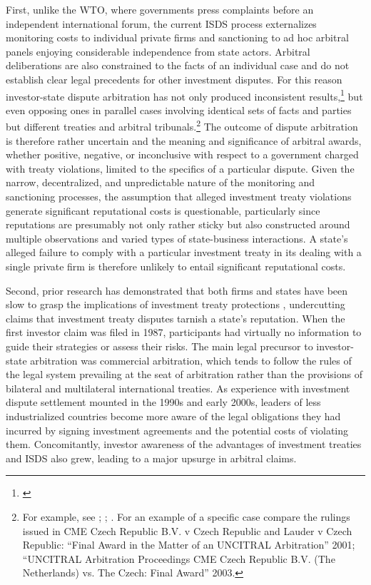 \documentclass[12pt,onesided]{amsart}
\begin{document}
First, unlike the WTO, where governments press complaints before an independent international forum, the current ISDS process externalizes monitoring costs to individual private firms and sanctioning to ad hoc arbitral panels enjoying considerable independence from state actors. Arbitral deliberations are also constrained to the facts of an individual case and do not establish clear legal precedents for other investment disputes. For this reason investor-state dispute arbitration has not only produced inconsistent results,\footnote{\citet{franck:2005}} but even opposing ones in parallel cases involving identical sets of facts and parties but different treaties and arbitral tribunals.\footnote{For example, see \citet{franck:2005}; \citet{kim2011annulment}; \citet{egli2006don}. For an example of a specific case compare the rulings issued in CME Czech Republic B.V. v Czech Republic and Lauder v Czech Republic: ``Final Award in the Matter of an UNCITRAL Arbitration'' 2001; ``UNCITRAL Arbitration Proceedings CME Czech Republic B.V. (The Netherlands) vs. The Czech: Final Award'' 2003.} The outcome of dispute arbitration is therefore rather uncertain and the meaning and significance of arbitral awards, whether positive, negative, or inconclusive with respect to a government charged with treaty violations, limited to the specifics of a particular dispute. Given the narrow, decentralized, and unpredictable nature of the monitoring and sanctioning processes, the assumption that alleged investment treaty violations generate significant reputational costs is questionable, particularly since reputations are presumably not only rather sticky but also constructed around multiple observations and varied types of state-business interactions. A state's alleged failure to comply with a particular investment treaty in its dealing with a single private firm is therefore unlikely to entail significant reputational costs.

Second, prior research has demonstrated that both firms and states have been slow to grasp the implications of investment treaty protections \citep{yackee2010much,poulsen2013claim,poulsen2015bounded}, undercutting claims that investment treaty disputes tarnish a state's reputation. When the first investor claim was filed in 1987, participants had virtually no information to guide their strategies or assess their risks. The main legal precursor to investor-state arbitration was commercial arbitration, which tends to follow the rules of the legal system prevailing at the seat of arbitration rather than the provisions of bilateral and multilateral international treaties. As experience with investment dispute settlement mounted in the 1990s and early 2000s, leaders of less industrialized countries become more aware of the legal obligations they had incurred by signing investment agreements and the potential costs of violating them. Concomitantly, investor awareness of the advantages of investment treaties and ISDS also grew, leading to a major upsurge in arbitral claims. 
\end{document}

